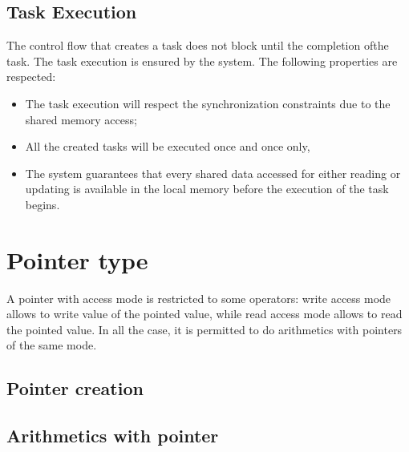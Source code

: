 \subsection{Task Execution}\label{sec:task_exec}

The control flow that creates a task does not block until the completion ofthe task.
The task execution is ensured by the \kaapi system. The following
properties are respected:
\begin{itemize}
\item The task execution will respect the synchronization constraints due to the shared memory access;
\item All the created tasks will be executed once and once only,
\item The \kaapi system guarantees that every shared data accessed 
for either reading or updating is available in the local memory before the execution
of the task begins.

\end{itemize}


\section{Pointer type} \label{sec:pointer}

A pointer with access mode is restricted to some operators: write access mode allows to write value of the pointed value, while read access mode allows to read the pointed value. In all the case, it is permitted to do arithmetics with pointers of the same mode.

\subsection{Pointer creation}

\subsection{Arithmetics with pointer}


